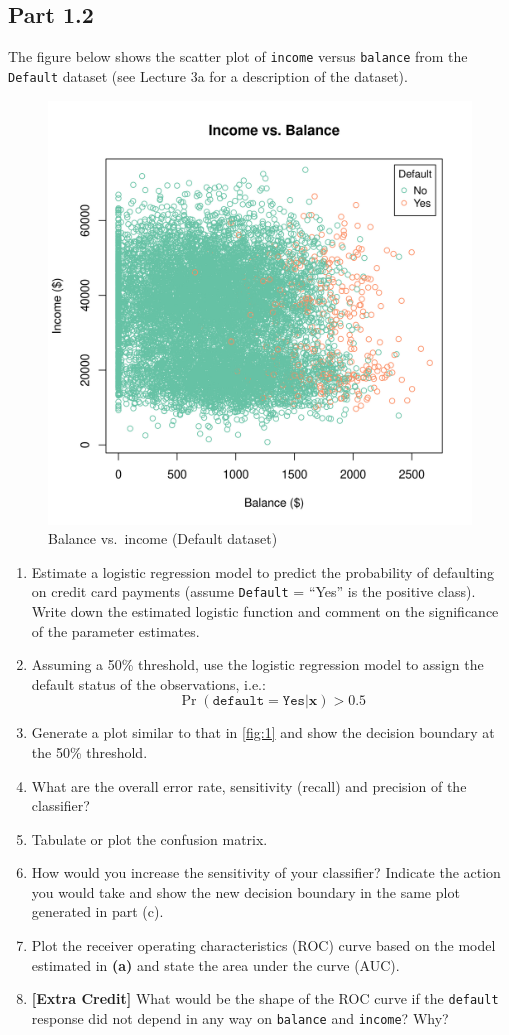 \documentclass[11pt,twoside]{article}
\newcommand{\pts}[1]{\marginpar{ \small\hspace{0pt} \textit{[#1]} } }
\newcommand{\?}{\stackrel{?}{=}}
\begin{document}
\subsection*{Part 1.2}
The figure below shows the scatter plot of \texttt{income} versus \texttt{balance} from the \texttt{Default} dataset (see Lecture 3a for a description of the dataset).
\begin{figure}[h!]
  \centering
  \includegraphics[width=.6\textwidth]{income-balance}
  \caption{Balance vs.\ income (Default dataset)}
  \label{fig:1}
\end{figure}
\begin{enumerate}[\bf (a)]
\item Estimate a logistic regression model to predict the probability of defaulting on credit card payments (assume \texttt{Default} = ``Yes'' is the positive class). \pts{3}
  Write down the estimated logistic function and comment on the significance of the parameter estimates.
\item Assuming a 50\% threshold,  use the logistic regression model to assign the default  status of the \pts{1} observations, i.e.:
  \begin{equation}
    \label{eq:3}
    \Pr(\mathtt{default = Yes}|\bm x) > 0.5
  \end{equation}
\item Generate a plot similar to that in \autoref{fig:1} \pts{3} and show the decision boundary at the 50\% threshold.
\item What are the overall error rate, sensitivity (recall) and precision of the classifier? \pts{3}
\item Tabulate or plot the confusion matrix. \pts{2}
\item How would you increase the sensitivity of your classifier? \pts{2}
  Indicate the action you would take and show the new decision boundary in the same plot generated in part (c).
\item Plot the receiver operating characteristics (ROC) curve based on the model \pts{2}
  estimated in \textbf{(a)} and state the area under the curve (AUC).
\item {\bf [Extra Credit]} What would be the shape of the ROC curve if the \texttt{default} response \pts{2}
  did not depend in any way on \texttt{balance} and \texttt{income}? Why?
\end{enumerate}  
\end{document}
